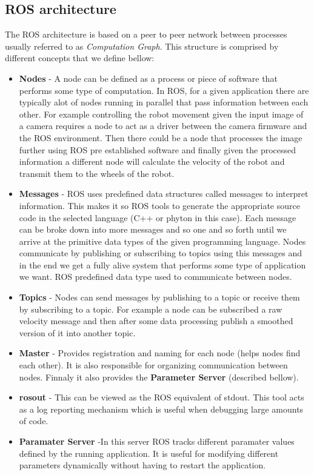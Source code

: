 \subsection{ROS architecture}
The \ac{ROS}  architecture is based on a peer to peer network between processes usually referred to as \textit{Computation Graph}. This structure is comprised by different concepts that we define bellow:
\begin{itemize}
\item \textbf{Nodes} - A node can be defined as a process or piece of software  that performs some type of computation. In \ac{ROS}, for a given application there are typically alot of nodes running in parallel that pass information between each other. For example  controlling the robot movement given the input image of a camera requires a node to act as a driver between the camera firmware and the ROS environment. Then there could be a node that processes the image further using ROS pre established software and finally given the processed information a different node will calculate the velocity of the robot and transmit them to the wheels of the robot. 
\item \textbf{Messages} - \ac{ROS} uses predefined data structures  called messages to interpret information. This makes it so \ac{ROS} tools to generate the appropriate source code in the selected language (C++ or phyton in this case). Each message can be broke down into more messages and so one and so forth until we arrive at the primitive data types of the given programming language. Nodes communicate by publishing or subscribing  to topics using this messages and in the end we get a fully alive system that performs some type of application we want. 
ROS predefined data type used to communicate between nodes.
\item \textbf{Topics} - Nodes can send messages by publishing to a topic or receive them by subscribing to a topic. For example a node can be subscribed a raw velocity message and then after some data processing publish a smoothed version of it into another topic.  
\item \textbf{Master} - Provides registration and naming for each node (helps nodes find each other). It is also responsible for organizing communication between nodes. Finnaly it also provides the \textbf{Parameter Server} (described bellow).
\item \textbf{rosout} - This can be viewed as the ROS equivalent of stdout. This tool acts as a log reporting mechanism which is useful when debugging large amounts of code.
\item \textbf{Paramater Server} -In this server \ac{ROS} tracks different paramater values defined by the running application. It is useful for modifying different parameters dynamically without having to restart the application.
\end{itemize}


